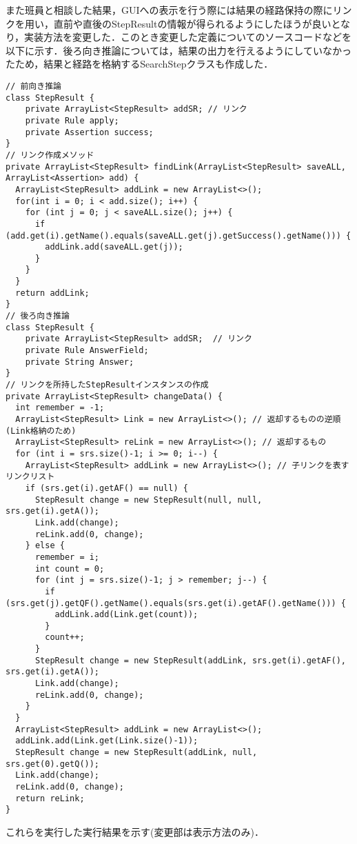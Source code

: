 \documentclass[12pt]{jarticle}
\begin{document}
また班員と相談した結果，GUIへの表示を行う際には結果の経路保持の際にリンクを用い，直前や直後のStepResultの情報が得られるようにしたほうが良いとなり，実装方法を変更した．このとき変更した定義についてのソースコードなどを以下に示す．後ろ向き推論については，結果の出力を行えるようにしていなかったため，結果と経路を格納するSearchStepクラスも作成した．
\begin{lstlisting}[caption=実装方法の変更部,label=change]
// 前向き推論
class StepResult {
	private ArrayList<StepResult> addSR; // リンク
	private Rule apply;
	private Assertion success;
}
// リンク作成メソッド
private ArrayList<StepResult> findLink(ArrayList<StepResult> saveALL, ArrayList<Assertion> add) {
  ArrayList<StepResult> addLink = new ArrayList<>();
  for(int i = 0; i < add.size(); i++) {
    for (int j = 0; j < saveALL.size(); j++) {
      if (add.get(i).getName().equals(saveALL.get(j).getSuccess().getName())) {
        addLink.add(saveALL.get(j));
      }
    }
  }
  return addLink;
}
// 後ろ向き推論
class StepResult {
	private ArrayList<StepResult> addSR;  // リンク
	private Rule AnswerField;
	private String Answer;
}
// リンクを所持したStepResultインスタンスの作成
private ArrayList<StepResult> changeData() {
  int remember = -1;
  ArrayList<StepResult> Link = new ArrayList<>(); // 返却するものの逆順(Link格納のため)
  ArrayList<StepResult> reLink = new ArrayList<>(); // 返却するもの
  for (int i = srs.size()-1; i >= 0; i--) {
    ArrayList<StepResult> addLink = new ArrayList<>(); // 子リンクを表すリンクリスト
    if (srs.get(i).getAF() == null) {
      StepResult change = new StepResult(null, null, srs.get(i).getA());
      Link.add(change);
      reLink.add(0, change);
    } else {
      remember = i;
      int count = 0;
      for (int j = srs.size()-1; j > remember; j--) {
        if (srs.get(j).getQF().getName().equals(srs.get(i).getAF().getName())) {
          addLink.add(Link.get(count));
        }
        count++;
      }
      StepResult change = new StepResult(addLink, srs.get(i).getAF(), srs.get(i).getA());
      Link.add(change);
      reLink.add(0, change);
    }
  }
  ArrayList<StepResult> addLink = new ArrayList<>();
  addLink.add(Link.get(Link.size()-1));
  StepResult change = new StepResult(addLink, null, srs.get(0).getQ());
  Link.add(change);
  reLink.add(0, change);
  return reLink;
}
\end{lstlisting}
これらを実行した実行結果を示す(変更部は表示方法のみ)．
\end{document}
